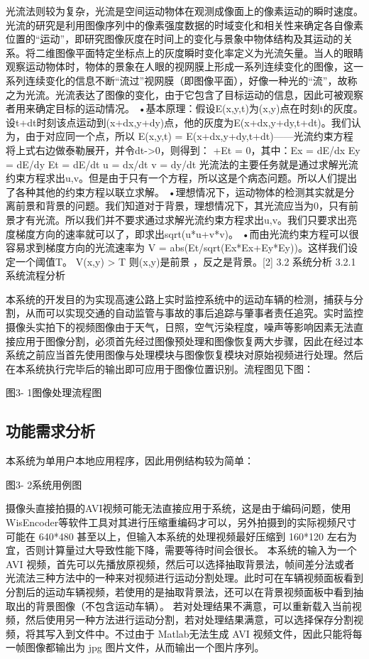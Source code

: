 \documentclass[18pt, twoside, a4paper, dvipdfm]{book}
\begin{document}
光流法则较为复杂，光流是空间运动物体在观测成像面上的像素运动的瞬时速度。光流的研究是利用图像序列中的像素强度数据的时域变化和相关性来确定各自像素位置的“运动”，即研究图像灰度在时间上的变化与景象中物体结构及其运动的关系。将二维图像平面特定坐标点上的灰度瞬时变化率定义为光流矢量。当人的眼睛观察运动物体时，物体的景象在人眼的视网膜上形成一系列连续变化的图像，这一系列连续变化的信息不断“流过”视网膜（即图像平面），好像一种光的“流”，故称之为光流。光流表达了图像的变化，由于它包含了目标运动的信息，因此可被观察者用来确定目标的运动情况。
•基本原理：假设E(x,y,t)为(x,y)点在时刻t的灰度。设t+dt时刻该点运动到(x+dx,y+dy)点，他的灰度为E(x+dx,y+dy,t+dt)。我们认为，由于对应同一个点，所以
  E(x,y,t) = E(x+dx,y+dy,t+dt)——光流约束方程
  将上式右边做泰勒展开，并令dt->0，则得到：       +Et = 0，其中：Ex = dE/dx  Ey = dE/dy  Et = dE/dt  u = dx/dt  v = dy/dt
  光流法的主要任务就是通过求解光流约束方程求出u,v。但是由于只有一个方程，所以这是个病态问题。所以人们提出了各种其他的约束方程以联立求解。
•理想情况下，运动物体的检测其实就是分离前景和背景的问题。我们知道对于背景，理想情况下，其光流应当为0，只有前景才有光流。所以我们并不要求通过求解光流约束方程求出u,v。我们只要求出亮度梯度方向的速率就可以了，即求出sqrt(u*u+v*v)。
•而由光流约束方程可以很容易求到梯度方向的光流速率为 V = abs(Et/sqrt(Ex*Ex+Ey*Ey))。这样我们设定一个阈值T。
V(x,y) > T 则(x,y)是前景 ，反之是背景。[2]
3.2 系统分析
3.2.1 系统流程分析

 	本系统的开发目的为实现高速公路上实时监控系统中的运动车辆的检测，捕获与分割，从而可以实现交通的自动监管与事故的事后追踪与肇事者责任追究。实时监控摄像头实拍下的视频图像由于天气，日照，空气污染程度，噪声等影响因素无法直接应用于图像分割，必须首先经过图像预处理和图像恢复两大步骤，因此在经过本系统之前应当首先使用图像与处理模块与图像恢复模块对原始视频进行处理。然后在本系统执行完毕后的输出即可应用于图像位置识别。流程图见下图：

 

图3- 1图像处理流程图

\subsection{功能需求分析}

本系统为单用户本地应用程序，因此用例结构较为简单：
 

图3- 2系统用例图

摄像头直接拍摄的AVI视频可能无法直接应用于系统，这是由于编码问题，使用WisEncoder等软件工具对其进行压缩重编码才可以，另外拍摄到的实际视频尺寸可能在 640*480 甚至以上，但输入本系统的处理视频最好压缩到 160*120 左右为宜，否则计算量过大导致性能下降，需要等待时间会很长。
本系统的输入为一个 AVI 视频，首先可以先播放原视频，然后可以选择抽取背景法，帧间差分法或者光流法三种方法中的一种来对视频进行运动分割处理。此时可在车辆视频面板看到分割后的运动车辆视频，若使用的是抽取背景法，还可以在背景视频面板中看到抽取出的背景图像（不包含运动车辆）。
若对处理结果不满意，可以重新载入当前视频，然后使用另一种方法进行运动分割，若对处理结果满意，可以选择保存分割视频，将其写入到文件中。不过由于 Matlab无法生成 AVI 视频文件，因此只能将每一帧图像都输出为 jpg 图片文件，从而输出一个图片序列。
\end{document}
